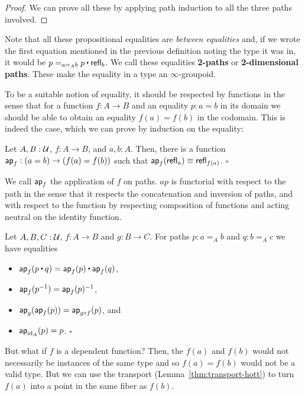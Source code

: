 \begin{proof}
We can prove all these by applying path induction to all the three paths involved.
\end{proof}

Note that all these propositional equalities are \emph{between equalities} and,
if we wrote the first equation mentioned in the previous definition noting the
type it was in, it would be $p =_{a =_A b} p \ct \refl_b$.
We call these equalities \textbf{2-paths} or \textbf{2-dimensional paths}.
These make the equality in a type an $\infty$-groupoid.

To be a suitable notion of equality, it should be respected by functions in the
sense that for a function $f : A \to B$ and an equality $p : a = b$ in its domain
we should be able to obtain an equality $f(a) = f(b)$ in the codomain.
This is indeed the case, which we can prove by induction on the equality:
\begin{lemma}
Let $A, B : \mathcal{U}$, $f : A \to B$, and $a, b : A$. Then, there is a function
$\mathsf{ap}_f : (a = b) \to (f(a) = f(b))$ such that $\mathsf{ap}_f(\mathsf{refl}_a) \equiv \mathsf{refl}_{f(a)}$.
\hfill $\square$
\end{lemma}

We call $\mathsf{ap}_f$ the application of $f$ on paths. $ap$ is functorial with respect
to the path in the sense that it respects the concatenation and inversion of
paths, and with respect to the function by respecting composition of functions
and acting neutral on the identity function.

\begin{lemma}
Let $A, B, C : \mathcal{U}$, $f : A \to B$ and $g : B \to C$. For paths $p : a =_A b$ and
$q : b =_A c$ we have equalities
\begin{itemize}
\item $\ap_f(p \ct q) = \ap_f(p) \ct \ap_f(q)$,
\item $\mathsf{ap}_f(p^{-1}) = \mathsf{ap}_f(p)^{-1}$,
\item $\mathsf{ap}_g(\mathsf{ap}_f(p)) = \mathsf{ap}_{g \circ f}(p)$, and
\item $\mathsf{ap}_{\operatorname{id}_A}(p) = p$. \hfill $\square$
\end{itemize}
\end{lemma}

But what if $f$ is a dependent function? Then, the $f(a)$ and $f(b)$ would not
necessarily be instances of the same type and so $f(a) = f(b)$ would not be a
valid type.
But we can use the transport (Lemma~\ref{thm:transport-hott}) to turn $f(a)$ into
a point in the same fiber as $f(b)$.

